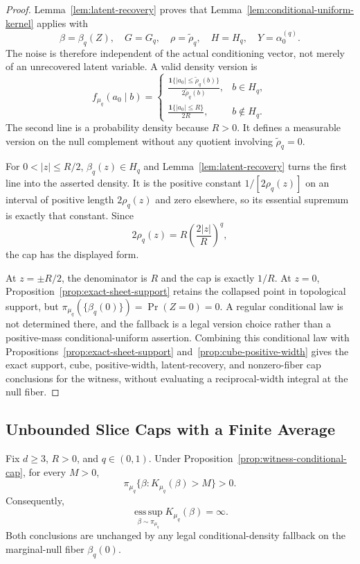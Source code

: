 \begin{proof}
Lemma~\ref{lem:latent-recovery} proves that
Lemma~\ref{lem:conditional-uniform-kernel} applies with
\[
\beta=\beta_q(Z),\quad G=G_q,\quad
\rho=\widetilde\rho_q,\quad H=H_q,
\quad Y=\alpha_0^{(q)}.
\]
The noise is therefore independent of the actual conditioning vector,
not merely of an unrecovered latent variable.  A valid density version is
\[
f_{\mu_q}(a_0\mid b)=
\begin{cases}
\displaystyle
\frac{\mathbf1\{|a_0|\leq\widetilde\rho_q(b)\}}
     {2\widetilde\rho_q(b)},&b\in H_q,\\[8pt]
\displaystyle
\frac{\mathbf1\{|a_0|\leq R\}}{2R},&b\notin H_q.
\end{cases}
\]
The second line is a probability density because $R>0$.  It defines a
measurable version on the null complement without any quotient involving
$\widetilde\rho_q=0$.

For $0<|z|\leq R/2$, $\beta_q(z)\in H_q$ and
Lemma~\ref{lem:latent-recovery} turns the first line into the asserted
density.  It is the positive constant $1/[2\rho_q(z)]$ on an interval of
positive length $2\rho_q(z)$ and zero elsewhere, so its essential
supremum is exactly that constant.  Since
\[
2\rho_q(z)=R\left(\frac{2|z|}{R}\right)^q,
\]
the cap has the displayed form.

At $z=\pm R/2$, the denominator is $R$ and the cap is exactly $1/R$.
At $z=0$, Proposition~\ref{prop:exact-sheet-support} retains the
collapsed point in topological support, but
$\pi_{\mu_q}(\{\beta_q(0)\})=\Pr(Z=0)=0$.  A regular conditional law is
not determined there, and the fallback is a legal version choice rather
than a positive-mass conditional-uniform assertion.  Combining this
conditional law with Propositions~\ref{prop:exact-sheet-support}
and~\ref{prop:cube-positive-width} gives the exact support, cube,
positive-width, latent-recovery, and nonzero-fiber cap conclusions for the
witness, without evaluating a reciprocal-width integral at the null
fiber.
\end{proof}

\subsection{Unbounded Slice Caps with a Finite Average}
\label{app:witness-cap-integral}

\begin{lemma}
\label{lem:positive-mass-cap}
Fix $d\geq3$, $R>0$, and $q\in(0,1)$.  Under
Proposition~\ref{prop:witness-conditional-cap}, for every $M>0$,
\[
\pi_{\mu_q}\{\beta:K_{\mu_q}(\beta)>M\}>0.
\]
Consequently,
\[
\operatorname*{ess\,sup}_{\beta\sim\pi_{\mu_q}}
K_{\mu_q}(\beta)=\infty.
\]
Both conclusions are unchanged by any legal conditional-density fallback
on the marginal-null fiber $\beta_q(0)$.
\end{lemma}

